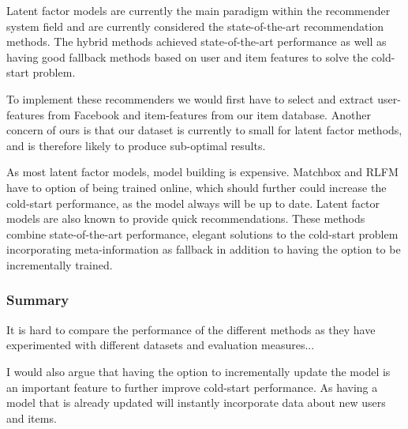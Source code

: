 Latent factor models are currently the main paradigm within the recommender
system field and are currently considered the state-of-the-art recommendation
methods. The hybrid methods achieved state-of-the-art performance as well as
having good fallback methods based on user and item features to solve the
cold-start problem.


To implement these recommenders we would first have to select and extract
user-features from Facebook and item-features from our item database. Another
concern of ours is that our dataset is currently to small for latent factor
methods, and is therefore likely to produce sub-optimal results.

As most latent factor models, model building is expensive. Matchbox and RLFM
have to option of being trained online, which should further could increase the
cold-start performance, as the model always will be up to date. Latent factor
models are also known to provide quick recommendations. These methods combine
state-of-the-art performance, elegant solutions to the cold-start problem
incorporating meta-information as fallback in addition to having the option to
be incrementally trained.

\subsubsection{Summary}


It is hard to compare the performance of the different methods as they have
experimented with different datasets and evaluation measures...

I would also argue that having the option to incrementally update the model is
an important feature to further improve cold-start performance. As having a
model that is already updated will instantly incorporate data about new users
and items.

